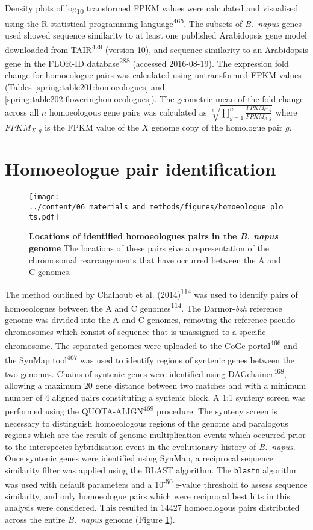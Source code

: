 \documentclass[12pt,]{book}
\begin{document}
Density plots of log\textsubscript{10} transformed FPKM values were
calculated and visualised using the R statistical programming
language\textsuperscript{465}. The subsets of \emph{B.~napus} genes used
showed sequence similarity to at least one published Arabidopsis gene
model downloaded from TAIR\textsuperscript{429} (version 10), and
sequence similarity to an Arabidopsis gene in the FLOR-ID
database\textsuperscript{288} (accessed 2016-08-19). The expression fold
change for homoeologue pairs was calculated using untransformed FPKM
values (Tables \ref{spring:table201:homoeologues} and
\ref{spring:table202:floweringhomoeologues}). The geometric mean of the
fold change across all \(n\) homoeologous gene pairs was calculated as
\(\sqrt[n]{\prod_{g=1}^{n} \frac{\mathit{FPKM}_{C,g}}{\mathit{FPKM}_{A,g}}}\)
where \(\mathit{FPKM}_{X,g}\) is the FPKM value of the \(X\) genome copy
of the homologue pair \(g\).

\section{Homoeologue pair
identification}\label{homoeologue-pair-identification}

\begin{figure}[htbp]
\centering
\texttt{[image: ../content/06\_materials\_and\_methods/figures/homoeologue\_plots.pdf]}
\caption{\textbf{Locations of identified homoeologues pairs in the
\emph{B. napus} genome} The locations of these pairs give a
representation of the chromosomal rearrangements that have occurred
between the A and C genomes.}\label{figure:methods:homoeologue}
\end{figure}

The method outlined by Chalhoub et al. (2014)\textsuperscript{114} was
used to identify pairs of homoeologues between the A and C
genomes\textsuperscript{114}. The Darmor-\emph{bzh} reference genome was
divided into the A and C genomes, removing the reference
pseudo-chromosomes which consist of sequence that is unassigned to a
specific chromosome. The separated genomes were uploaded to the CoGe
portal\textsuperscript{466} and the SynMap tool\textsuperscript{467} was
used to identify regions of syntenic genes between the two genomes.
Chains of syntenic genes were identified using
DAGchainer\textsuperscript{468}, allowing a maximum 20 gene distance
between two matches and with a minimum number of 4 aligned pairs
constituting a syntenic block. A 1:1 synteny screen was performed using
the QUOTA-ALIGN\textsuperscript{469} procedure. The synteny screen is
necessary to distinguish homoeologous regions of the genome and
paralogous regions which are the result of genome multiplication events
which occurred prior to the interspecies hybridisation event in the
evolutionary history of \emph{B.~napus}. Once syntenic genes were
identified using SynMap, a reciprocal sequence similarity filter was
applied using the BLAST algorithm. The \texttt{blastn} algorithm was
used with default parameters and a 10\textsuperscript{-50} e-value
threshold to assess sequence similarity, and only homoeologue pairs
which were reciprocal best hits in this analysis were considered. This
resulted in 14427 homoeologous pairs distributed across the entire
\emph{B.~napus} genome (Figure \ref{figure:methods:homoeologue}).
\end{document}
